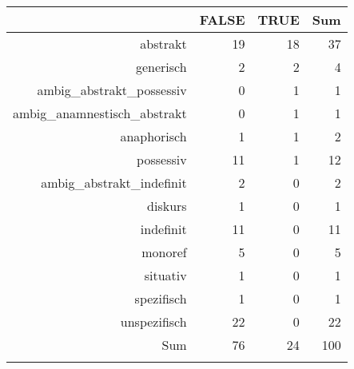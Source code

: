 \begin{tabular}{rrrr}
  \lsptoprule
 & FALSE & TRUE & Sum \\ 
  \midrule
abstrakt & 19 & 18 & 37 \\ 
  generisch & 2 & 2 & 4 \\ 
  ambig\_abstrakt\_possessiv & 0 & 1 & 1 \\ 
  ambig\_anamnestisch\_abstrakt & 0 & 1 & 1 \\ 
  anaphorisch & 1 & 1 & 2 \\ 
  possessiv & 11 & 1 & 12 \\ 
  ambig\_abstrakt\_indefinit & 2 & 0 & 2 \\ 
  diskurs & 1 & 0 & 1 \\ 
  indefinit & 11 & 0 & 11 \\ 
  monoref & 5 & 0 & 5 \\ 
  situativ & 1 & 0 & 1 \\ 
  spezifisch & 1 & 0 & 1 \\ 
  unspezifisch & 22 & 0 & 22 \\ 
  Sum & 76 & 24 & 100 \\ 
   \lspbottomrule
\end{tabular}
